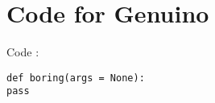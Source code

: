 \chapter{Code for Genuino}\label{code}\label{section \thechapter}

% 
Code :\\
\begin{verbatim}
def boring(args = None):
pass
\end{verbatim}
